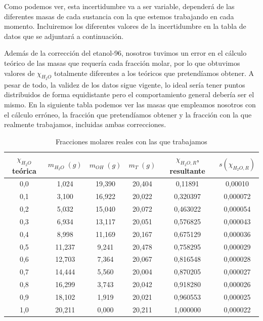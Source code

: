 \documentclass[a4paper,12pt,titlepage]{article}
\begin{document}
Como podemos ver, esta incertidumbre va a ser variable, dependerá de las diferentes masas de cada sustancia con la que estemos trabajando en cada momento. Incluiremos los diferentes valores de la incertidumbre en la tabla de datos que se adjuntará a continuación.

Además de la corrección del etanol-96, nosotros tuvimos un error en el cálculo teórico de las masas que requería cada fracción molar, por lo que obtuvimos valores de $\chi_{H_2O}$ totalmente diferentes a los teóricos que pretendíamos obtener. A pesar de todo, la validez de los datos sigue vigente, lo ideal sería tener puntos distribuidos de forma equidistante pero el comportamiento general debería ser el mismo. En la siguiente tabla podemos ver las masas que empleamos nosotros con el cálculo erróneo, la fracción que pretendíamos obtener y la fracción con la que realmente trabajamos, incluidas ambas correcciones.

\begin{table}[h!]
\centering
\begin{tabular}{|c|c|c|c|c|c|}
\hline
$\chi_{H_2O}$ teórica & $m_{H_2O} \;(g)$ & $m_{OH}\;(g)$ & $m_T\;(g)$ & $\chi_{H_2O,R}$, resultante & $s(\chi_{H_2O,R})$ \\ \hline
0,0                     & 1,024            & 19,390        & 20,404     & 0,11891                     & 0,00010            \\ \hline
0,1                   & 3,100            & 16,922        & 20,022     & 0,320397                    & 0,000072           \\ \hline
0,2                   & 5,032            & 15,040        & 20,072     & 0,463022                    & 0,000054           \\ \hline
0,3                   & 6,934            & 13,117        & 20,051     & 0,576825                    & 0,000043           \\ \hline
0,4                   & 8,998            & 11,169        & 20,167     & 0,675129                    & 0,000036           \\ \hline
0,5                   & 11,237           & 9,241         & 20,478     & 0,758295                    & 0,000029          \\ \hline
0,6                   & 12,703           & 7,364         & 20,067     & 0,816548                    & 0,000028           \\ \hline
0,7                   & 14,444           & 5,560         & 20,004     & 0,870205                    & 0,000027           \\ \hline
0,8                   & 16,299           & 3,743         & 20,042     & 0,918280                    & 0,000026           \\ \hline
0,9                   & 18,102           & 1,919         & 20,021     & 0,960553                    & 0,000025           \\ \hline
1,0                     & 20,211           & 0,000             & 20,211     & 1,000000                    & 0,000022           \\ \hline
\end{tabular}
\caption{Fracciones molares reales con las que trabajamos}
\label{tab:my-table}
\end{table}
\end{document}

